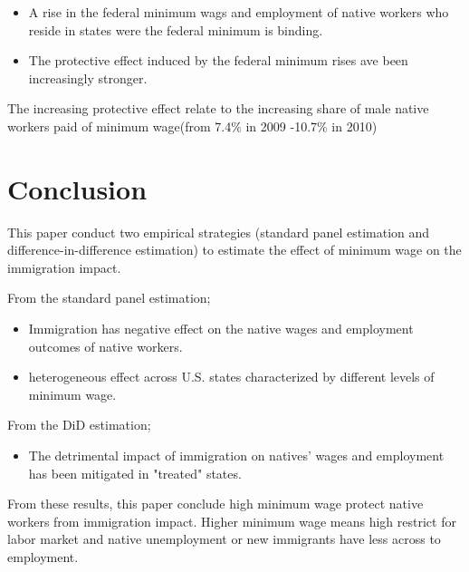 \documentclass[../root]{subfiles}
\begin{document}
    \begin{itemize}
        \item A rise in the federal minimum wags and employment of native workers who reside in states were the federal minimum is binding.
        \item The protective effect induced by the federal minimum rises ave been increasingly stronger.
    \end{itemize}

    The increasing protective effect relate to the increasing share of male native workers paid of minimum wage(from 7.4$\%$ in 2009 -10.7$\%$ in 2010) 


    \section{Conclusion}
    This paper conduct two empirical strategies (standard panel estimation and difference-in-difference estimation) to estimate the effect of minimum wage on the immigration impact.

    From the standard panel estimation;
    \begin{itemize}
        \item Immigration has negative effect on the native wages and employment outcomes of native workers.
        \item heterogeneous effect across U.S. states characterized by different levels of minimum wage. 
    \end{itemize}
    

    From the DiD estimation;
    \begin{itemize}
        \item The detrimental impact of immigration on natives' wages and employment has been mitigated in "treated" states.
    \end{itemize}

    From these results, this paper conclude high minimum wage protect native workers from immigration  impact.
    Higher minimum wage means high restrict for labor market and native unemployment or new immigrants have less across to employment.

    \biblio
    
    
\end{document}
